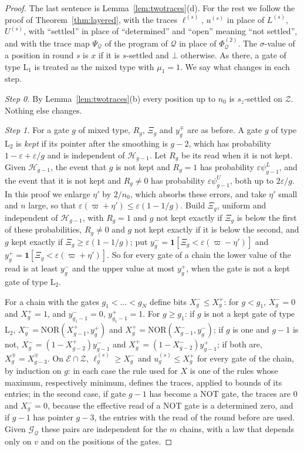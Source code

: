 \documentclass[11pt]{amsart}
\theoremstyle{definition}
\theoremstyle{remark}
\newcommand{\eps}{\varepsilon}
\newcommand{\NOR}{\mathrm{NOR}}
\begin{document}
\begin{proof}
The last sentence is Lemma~\ref{lem:twotraces}(d). For the rest we follow the proof of
Theorem~\ref{thm:layered}, with the traces $\ell^{(s)}$, $u^{(s)}$ in place of $L^{(s)}$,
$U^{(s)}$, with ``settled'' in place of ``determined'' and ``open'' meaning ``not settled'', and
with the trace map $\Psi_{\mathcal Q}$ of the program of $\mathcal Q$ in place of
$\Phi^{(2)}_{\mathcal Q}$. The $\sigma$-value of a position in round $s$ is $x$ if it is
$s$-settled and $\bot$ otherwise. As there, a gate of type $\mathrm L_1$ is treated as the mixed
type with $\mu_1=1$. We say what changes in each step.

\emph{Step 0.} By Lemma~\ref{lem:twotraces}(b) every position up to $n_0$ is $s_z$-settled on
$\mathcal Z$. Nothing else changes.

\emph{Step 1.} For a gate $g$ of mixed type, $R_g$, $\Xi_g$ and $y^\mp_g$ are as before. A gate
$g$ of type $\mathrm L_2$ is \emph{kept} if its pointer after the smoothing is $g-2$, which has
probability $1-\eps+\eps/g$ and is independent of $\mathcal H_{g-1}$. Let $R_g$ be its read
when it is not kept. Given $\mathcal H_{g-1}$, the event that $g$ is not kept and $R_g=1$ has
probability $\eps\psi^L_{g-1}$, and the event that it is not kept and $R_g\ne0$ has probability
$\eps\psi^U_{g-1}$, both up to $2\eps/g$. In this proof we enlarge $\eta'$ by $2/n_0$, which
absorbs these errors, and take $\eta'$ small and $n$ large, so that
$\eps(\varpi+\eta')\le\eps(1-1/g)$. Build $\Xi_g$, uniform and independent of $\mathcal H_{g-1}$, with
$R_g=1$ and $g$ not kept exactly if $\Xi_g$ is below the first of these probabilities, $R_g\ne0$ and
$g$ not kept exactly if it is below the second, and $g$ kept
exactly if $\Xi_g\ge\eps(1-1/g)$; put $y^-_g=\mathbf 1[\Xi_g<\eps(\varpi-\eta')]$ and
$y^+_g=\mathbf 1[\Xi_g<\eps(\varpi+\eta')]$. So for every gate of a chain the lower value of the
read is at least $y^-_g$ and the upper value at most $y^+_g$, when the gate is not a kept gate
of type $\mathrm L_2$.

For a chain with the gates $g_1<\dots<g_N$ define bits $X^-_g\le X^+_g$: for $g<g_1$,
$X^-_g=0$ and $X^+_g=1$, and $y^-_{g_1-1}=0$, $y^+_{g_1-1}=1$. For $g\ge g_1$:
if $g$ is not a kept gate of type $\mathrm L_2$, $X^-_g=\NOR(X^+_{g-1},y^+_g)$ and
$X^+_g=\NOR(X^-_{g-1},y^-_g)$; if $g$ is one and $g-1$ is not, $X^-_g=(1-X^+_{g-2})y^-_{g-1}$ and
$X^+_g=(1-X^-_{g-2})y^+_{g-1}$; if both are, $X^\mp_g=X^\mp_{g-3}$. On
$\mathcal E\cap\mathcal Z$, $\ell^{(s)}_g\ge X^-_g$ and $u^{(s)}_g\le X^+_g$ for every gate of
the chain, by induction on $g$: in each case the rule used for $X$ is one of the rules whose
maximum, respectively minimum, defines the traces, applied to bounds of its entries; in the
second case, if gate $g-1$ has become a NOT gate, the traces are $0$ and $X^-_g=0$, because the
effective read of a NOT gate is a determined zero, and if $g-1$ has pointer $g-3$, the entries
with the read of the round before are used. Given
$\mathcal G_{\mathcal Q}$ these pairs are independent for the $m$ chains, with a law that
depends only on $v$ and on the positions of the gates.


\end{proof}
\end{document}
